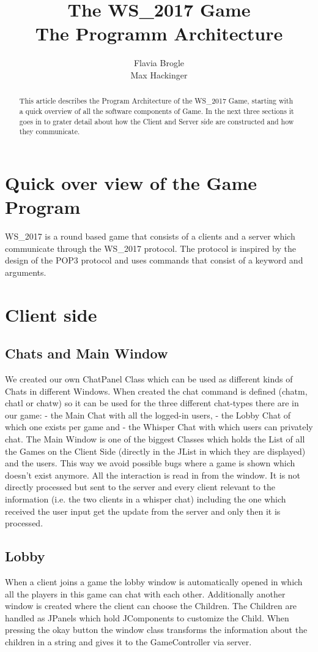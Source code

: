 \documentclass[11pt,a4paper]{article}
\title{The WS\_2017 Game \\ The Programm Architecture}
\author{Flavia Brogle \\ Max Hackinger}
\begin{document}
	\maketitle
  \tableofcontents
  
\begin{abstract}
  This article describes the Program Architecture of the WS\_2017 Game, starting with a quick overview of all the  software components of Game. In the next three sections it goes in to grater detail about how the Client and Server side are constructed and how they communicate.
\end{abstract}  
  \clearpage
	\section{Quick over view of the Game Program}
	  WS\_2017 is a round based game that consists of a clients and a server which communicate through the WS\_2017 protocol. The protocol is inspired by the design of the POP3 protocol and uses commands that consist of a keyword and arguments.

	\section{Client side}
		\subsection{Chats and Main Window}
We created our own ChatPanel Class which can be used as different kinds of Chats in different Windows. When created the chat command is defined (chatm, chatl or chatw) so it can be used for the three different chat-types there are in our game:
- the Main Chat with all the logged-in users,
- the Lobby Chat of which one exists per game and
- the Whisper Chat with which users can privately chat.
The Main Window is one of the biggest Classes which holds the List of all the Games on the Client Side (directly in the JList in which they are displayed) and the users. This way we avoid possible bugs where a game is shown which doesn't exist anymore.
All the interaction is read in from the window. It is not directly processed but sent to the server and every client relevant to the information (i.e. the two clients in a whisper chat) including the one which received the user input get the update from the server and only then it is processed.

		\subsection{Lobby}
		When a client joins a game the lobby window is automatically opened in which all the players in this game can chat with each other. Additionally another window is created where the client can choose the Children. The Children are handled as JPanels which hold JComponents to customize the Child. When pressing the okay button the window class transforms the information about the children in a string and gives it to the GameController via server.
\end{document}
